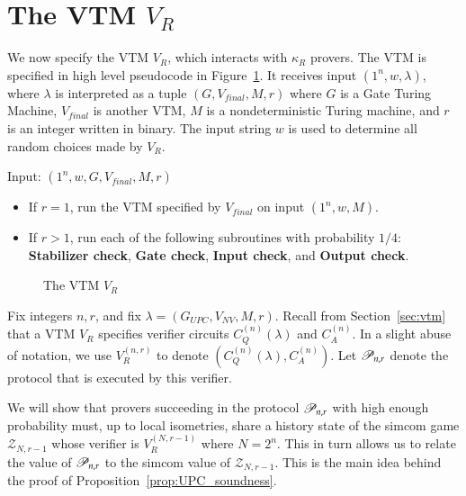
\section{The VTM $V_R$}
\label{sec:vtm_r}

We now specify the VTM $V_R$, which interacts with $\kappa_R$ provers. The VTM is specified in high level pseudocode in Figure~\ref{fig:vtm}. It receives input $(1^n,w,\lambda)$, where $\lambda$ is interpreted as a tuple $(G,V_{final},M,r)$ where $G$ is a Gate Turing Machine, $V_{final}$ is another VTM, $M$ is a nondeterministic Turing machine, and $r$ is an integer written in binary. The input string $w$ is used to determine all random choices made by $V_R$.

\begin{center}
\begin{mdframed}
    Input: $(1^n,w,G,V_{final},M,r)$
    \begin{itemize}
    	\item If $r = 1$, run the VTM specified by $V_{final}$ on input $(1^n,w,M)$.
	
		\item If $r > 1$, run each of the following subroutines with probability $1/4$: \textbf{Stabilizer check}, \textbf{Gate check}, \textbf{Input check}, and \textbf{Output check}.
		\end{itemize}
\end{mdframed}

\begin{figure}[H]
\caption{The VTM $V_R$}
\label{fig:vtm}
\end{figure}
\end{center}

Fix integers $n, r$, and fix $\lambda = (G_{UPC},V_{NV},M,r)$. Recall from Section~\ref{sec:vtm} that a VTM $V_R$ specifies verifier circuits $C_Q^{(n)}(\lambda)$ and $C_A^{(n)}$. In a slight abuse of notation, we use $V_R^{(n,r)}$ to denote $(C_Q^{(n)}(\lambda),C_A^{(n)})$. Let $\mathscr{P}_{n,r}$ denote the protocol that is executed by this verifier. 

We will show that provers succeeding in the protocol $\mathscr{P}_{n,r}$ with high enough probability must, up to local isometries, share a history state of the simcom game $\mathscr{Z}_{N,r-1}$ whose verifier is $V_R^{(N,r-1)}$ where $N = 2^n$. This in turn allows us to relate the value of $\mathscr{P}_{n,r}$ to the simcom value of $\mathscr{Z}_{N,r-1}$. This is the main idea behind the proof of Proposition~\ref{prop:UPC_soundness}.


